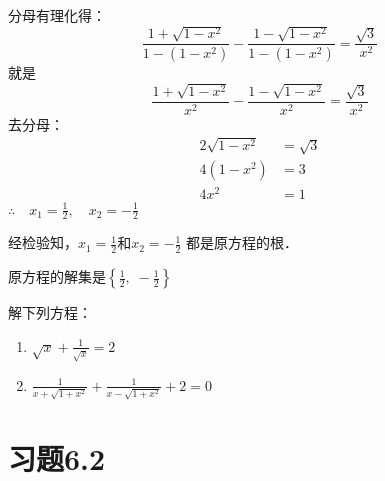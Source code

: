 \begin{solution}
    分母有理化得：
\[\frac{1+\sqrt{1-x^2}}{1-(1-x^2)}-\frac{1-\sqrt{1-x^2}}{1-(1-x^2)}=\frac{\sqrt{3}}{x^2}\]
就是
\[\frac{1+\sqrt{1-x^2}}{x^2}-\frac{1-\sqrt{1-x^2}}{x^2}=\frac{\sqrt{3}}{x^2}\]
去分母：
\[\begin{split}
    2\sqrt{1-x^2}&= \sqrt{3}\\
    4(1-x^2)&=3\\
    4x^2&=1
\end{split}\]
$\therefore\quad x_1=\frac{1}{2},\quad x_2=-\frac{1}{2}$

经检验知，$x_1=\frac{1}{2}$和$x_2=-\frac{1}{2}$
都是原方程的根．

原方程的解集是$\left\{\frac{1}{2},\; -\frac{1}{2}\right\}$
\end{solution}

\begin{ex}
    解下列方程：
\begin{enumerate}
    \item $\sqrt{x}+\frac{1}{\sqrt{x}}=2$
    \item $\frac{1}{x+\sqrt{1+x^2}}+\frac{1}{x-\sqrt{1+x^2}}+2=0$
\end{enumerate}
\end{ex}



\section*{习题6.2}

